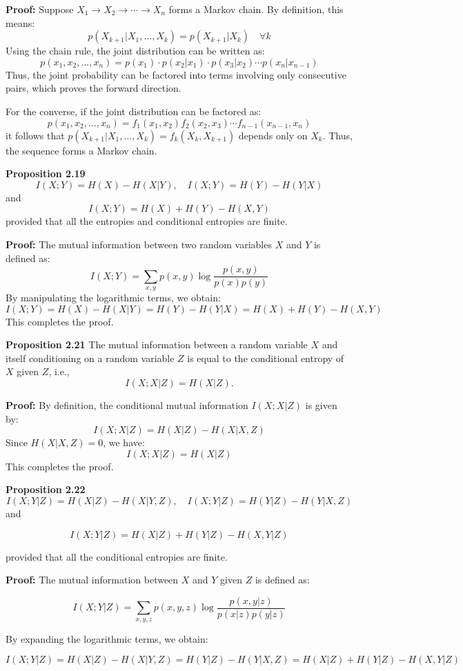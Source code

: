 \documentclass[a4paper,10pt]{article}
\begin{document}
\textbf{Proof:}
Suppose $X_1 \to X_2 \to \cdots \to X_n$ forms a Markov chain. By definition, this means:
$$
p(X_{k+1} | X_1, \ldots, X_k) = p(X_{k+1} | X_k) \quad \forall k
$$
Using the chain rule, the joint distribution can be written as:
$$
p(x_1, x_2, \ldots, x_n) = p(x_1) \cdot p(x_2|x_1) \cdot p(x_3|x_2) \cdots p(x_n|x_{n-1})
$$
Thus, the joint probability can be factored into terms involving only consecutive pairs, which proves the forward direction.

For the converse, if the joint distribution can be factored as:
$$
p(x_1, x_2, \ldots, x_n) = f_1(x_1, x_2) f_2(x_2, x_3) \cdots f_{n-1}(x_{n-1}, x_n)
$$
it follows that $p(X_{k+1}| X_1, \ldots, X_k) = f_{k}(X_k, X_{k+1})$ depends only on $X_k$. Thus, the sequence forms a Markov chain.

\textbf{Proposition 2.19}
$$
I(X; Y) = H(X) - H(X|Y), \quad I(X; Y) = H(Y) - H(Y|X)
$$
and
$$
I(X; Y) = H(X) + H(Y) - H(X, Y)
$$
provided that all the entropies and conditional entropies are finite.

\textbf{Proof:}
The mutual information between two random variables $X$ and $Y$ is defined as:
$$
I(X; Y) = \sum_{x, y} p(x, y) \log \frac{p(x, y)}{p(x)p(y)}
$$
By manipulating the logarithmic terms, we obtain:
$$
I(X; Y) = H(X) - H(X|Y) = H(Y) - H(Y|X) = H(X) + H(Y) - H(X, Y)
$$
This completes the proof.

\textbf{Proposition 2.21}
The mutual information between a random variable $X$ and itself conditioning on a random variable $Z$ is equal to the conditional entropy of $X$ given $Z$, i.e.,
$$
I(X; X|Z) = H(X|Z).
$$

\textbf{Proof:}
By definition, the conditional mutual information $I(X; X|Z)$ is given by:
$$
I(X; X|Z) = H(X|Z) - H(X|X, Z)
$$
Since $H(X|X, Z) = 0$, we have:
$$
I(X; X|Z) = H(X|Z)
$$
This completes the proof.

\textbf{Proposition 2.22}
$$
I(X; Y|Z) = H(X|Z) - H(X|Y, Z), \quad I(X; Y|Z) = H(Y|Z) - H(Y|X, Z)
$$
and

$$
I(X; Y|Z) = H(X|Z) + H(Y|Z) - H(X, Y|Z)
$$

provided that all the conditional entropies are finite.

\textbf{Proof:}
The mutual information between $X$ and $Y$ given $Z$ is defined as:

$$
I(X; Y|Z) = \sum_{x, y, z} p(x, y, z) \log \frac{p(x, y | z)}{p(x | z)p(y | z)}
$$

By expanding the logarithmic terms, we obtain:

$$
I(X; Y|Z) = H(X|Z) - H(X|Y, Z) = H(Y|Z) - H(Y|X, Z) = H(X|Z) + H(Y|Z) - H(X, Y|Z)
$$
\end{document}
